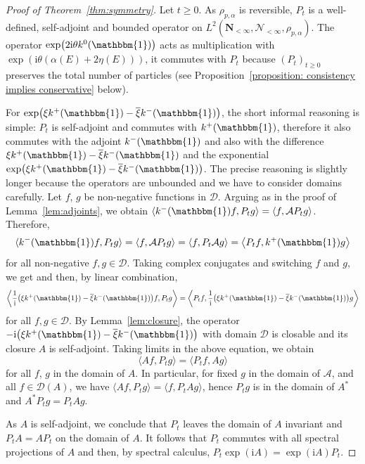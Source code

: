 \documentclass[10pt,a4paper]{amsart}
\numberwithin{equation}{section}
\newcommand{\1}{\mathbbm{1}}
\begin{document}
\begin{proof}[Proof of Theorem~\ref{thm:symmetry}]
	Let $t \geq 0$. As $\rho_{p,\alpha}$ is reversible, $P_t$ is a well-defined, self-adjoint and bounded operator on $L^2(\mathbf N_{<\infty}, \mathcal N_{<\infty}, \rho_{p, \alpha})$. The operator $\exp\bigl(2 \mathrm i \theta k^0(\1)\bigr)$ acts as multiplication with $\exp( \mathrm i \theta (\alpha(E) + 2\eta(E)))$, it commutes with $P_t$ because $(P_t)_{t \geq 0}$ preserves the total number of particles (see Proposition~\ref{proposition: consistency implies conservative} below).
	
		For $\exp\bigl( \xi k^+(\1) - \overline{\xi} k^-(\1)\bigr)$, the short informal reasoning is simple: $P_t$ is self-adjoint and commutes with $k^+(\1)$, therefore it also commutes with the adjoint $k^-(\1)$ and also with the difference $\xi k^+(\1) - \overline{\xi} k^-(\1)$ and the exponential $\exp\bigl( \xi k^+(\1) - \overline{\xi} k^-(\1)\bigr)$. The precise reasoning is slightly longer because the operators are unbounded and we have to consider domains carefully. Let $f$, $g$ be non-negative functions in $\mathcal D$. Arguing as in the proof of Lemma~\ref{lem:adjoints}, we obtain $\langle k^-(\1) f, P_t g\rangle = \langle f, \mathcal A P_t g \rangle$. Therefore,
	\[
		\langle k^-(\1) f, P_t g\rangle = \langle f, \mathcal A P_t g \rangle = \langle f, P_t \mathcal A g\rangle = \bigl\langle P_t f, k^+(\1) g\bigr\rangle
	\]
	for all non-negative $f,g\in \mathcal D$. 	Taking complex conjugates and switching $f$ and $g$, we get \smash{$\bigl\langle k^+(\1) f, P_t g \bigr\rangle = \langle P_t f, k^-(\1) g\rangle $} and then, by linear combination,
	\[
		\biggl \langle \frac 1{\mathrm i} \bigl(\xi k^+(\1) - \overline{\xi} k^-(\1)\bigr) f, P_t g\biggr \rangle =
		\biggl \langle P_t f, \frac 1{\mathrm i} \bigl(\xi k^+(\1) - \overline{\xi} k^-(\1)\bigr) g\biggr \rangle
	\]
	for all $f,g\in \mathcal D$. By Lemma~\ref{lem:closure}, the operator $- \mathrm {i}\bigl(\xi k^+(\1) - \overline{\xi} k^-(\1) \bigr)$ with domain $\mathcal D$ is closable and its closure $A$ is self-adjoint. 	
	Taking limits in the above equation, we obtain
	\[
		\langle A f, P_t g \rangle = \langle P_t f, A g\rangle
	\]
	for all $f$, $g$ in the domain of $A$. In particular, for fixed $g$ in the domain of $\mathcal A$, and all $f\in \mathcal D(A)$, we have $\langle A f, P_t g\rangle = \langle f, P_t A g \rangle$, hence $P_tg$ is in the domain of $A^*$ and $A^* P_t g = P_t A g$.
	
	As $A$ is self-adjoint, we conclude that $P_t$ leaves the domain of $A$ invariant and $P_t A = A P_t$ on the domain of $A$.
It follows that $P_t$ commutes with all spectral projections of $A$ \cite[Proposition~5.26]{schmudgen2012unbounded} and then, by spectral calculus, $P_t \exp(\mathrm i A) = \exp(\mathrm i A) P_t$. 	
\end{proof}
\end{document}
